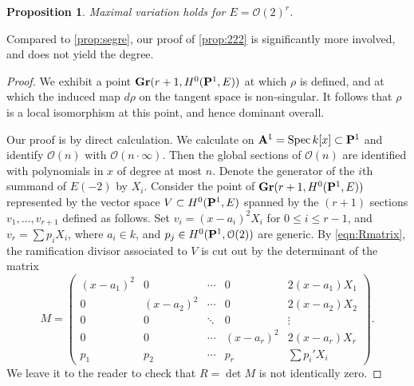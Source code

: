 \documentclass[11pt,reqno]{amsart}
\theoremstyle{plain}
\newtheorem{proposition}[theorem]{Proposition}
\theoremstyle{definition}
\theoremstyle{remark}
\numberwithin{equation}{section}
\renewcommand{\k}{k}
\numberwithin{equation}{section}
\renewcommand{\O}{\mathcal O}
\begin{document}
\begin{proposition}\label{prop:222}
  Maximal variation holds for $E = \O(2)^r$.
\end{proposition}
Compared to \autoref{prop:segre}, our proof of \autoref{prop:222} is significantly more involved, and does not yield the degree.
\begin{proof}
  We exhibit a point $\Gr(r+1, H^0(\P^1, E))$ at which $\rho$ is defined, and at which the induced map $d\rho$ on the tangent space is non-singular.
  It follows that $\rho$ is a local isomorphism at this point, and hence dominant overall.

  Our proof is by direct calculation.
  We calculate on $\A^1 = \spec \k[x] \subset \P^1$ and identify $\O(n)$ with $\O(n \cdot \infty)$.
  Then the global sections of $\O(n)$ are identified with polynomials in $x$ of degree at most $n$.
  Denote the generator of the $i$th summand of $E(-2)$ by $X_i$.
  Consider the point of $\Gr(r+1, H^0(\P^1, E))$ represented by the vector space $V \subset H^0(\P^1, E)$ spanned by the $(r+1)$ sections $v_1, \dots, v_{r+1}$ defined as follows.
  Set $v_i = (x-a_i)^2 X_i$ for $0 \leq i \leq r-1$, and $v_r = \sum p_i X_i$, where $a_i \in \k$, and $p_j \in H^0(\P^1, \O(2))$ are generic.
  By \eqref{eqn:Rmatrix}, the ramification divisor associated to $V$ is cut out by the determinant of the matrix
  \[
    M =
    \begin{pmatrix}
      (x-a_1)^2 & 0 &  \cdots & 0 & 2(x-a_1)X_1\\
      0 & (x-a_2)^2 & \cdots & 0 & 2(x-a_2)X_2\\
      0 & 0 & \ddots & 0 & \vdots\\
      0 & 0 & \cdots & (x-a_r)^2& 2(x-a_r)X_r\\
      p_1 & p_2 & \cdots & p_r & \sum p_i' X_i
    \end{pmatrix}.
  \]
  We leave it to the reader to check that $R = \det M$ is not identically zero.


\end{proof}
\end{document}

